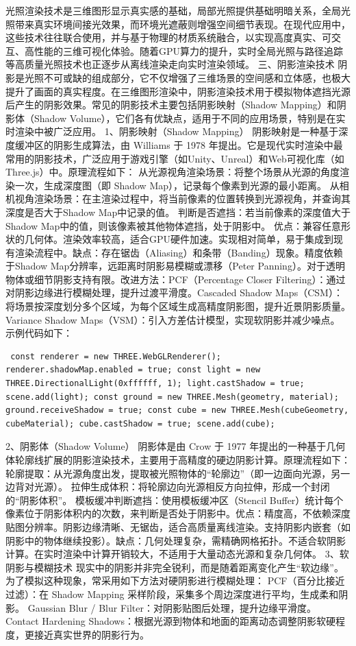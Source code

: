 光照渲染技术是三维图形显示真实感的基础，局部光照提供基础明暗关系，全局光照带来真实环境间接光效果，而环境光遮蔽则增强空间细节表现。在现代应用中，这些技术往往联合使用，并与基于物理的材质系统融合，以实现高度真实、可交互、高性能的三维可视化体验。随着GPU算力的提升，实时全局光照与路径追踪等高质量光照技术也正逐步从离线渲染走向实时渲染领域。 三、阴影渲染技术 阴影是光照不可或缺的组成部分，它不仅增强了三维场景的空间感和立体感，也极大提升了画面的真实程度。在三维图形渲染中，阴影渲染技术用于模拟物体遮挡光源后产生的阴影效果。常见的阴影技术主要包括阴影映射（Shadow Mapping）和阴影体（Shadow Volume），它们各有优缺点，适用于不同的应用场景，特别是在实时渲染中被广泛应用。 1、阴影映射（Shadow Mapping） 阴影映射是一种基于深度缓冲区的阴影生成算法，由 Williams 于 1978 年提出。它是现代实时渲染中最常用的阴影技术，广泛应用于游戏引擎（如Unity、Unreal）和Web可视化库（如Three.js）中。原理流程如下： 从光源视角渲染场景：将整个场景从光源的角度渲染一次，生成深度图（即 Shadow Map），记录每个像素到光源的最小距离。 从相机视角渲染场景：在主渲染过程中，将当前像素的位置转换到光源视角，并查询其深度是否大于Shadow Map中记录的值。 判断是否遮挡：若当前像素的深度值大于Shadow Map中的值，则该像素被其他物体遮挡，处于阴影中。 优点：兼容任意形状的几何体。渲染效率较高，适合GPU硬件加速。实现相对简单，易于集成到现有渲染流程中。缺点：存在锯齿（Aliasing）和条带（Banding）现象。精度依赖于Shadow Map分辨率，远距离时阴影易模糊或漂移（Peter Panning）。对于透明物体或细节阴影支持有限。改进方法：PCF（Percentage Closer Filtering）：通过对阴影边缘进行模糊处理，提升过渡平滑度。Cascaded Shadow Maps（CSM）：将场景按深度划分多个区域，为每个区域生成高精度阴影图，提升近景阴影质量。Variance Shadow Maps（VSM）：引入方差估计模型，实现软阴影并减少噪点。 示例代码如下： \begin{verbatim} const renderer = new THREE.WebGLRenderer(); renderer.shadowMap.enabled = true; const light = new THREE.DirectionalLight(0xffffff, 1); light.castShadow = true; scene.add(light); const ground = new THREE.Mesh(geometry, material); ground.receiveShadow = true; const cube = new THREE.Mesh(cubeGeometry, cubeMaterial); cube.castShadow = true; scene.add(cube); \end{verbatim} 2、阴影体（Shadow Volume） 阴影体是由 Crow 于 1977 年提出的一种基于几何体轮廓线扩展的阴影渲染技术，主要用于高精度的硬边阴影计算。原理流程如下： 轮廓提取：从光源角度出发，提取被光照物体的``轮廓边''（即一边面向光源，另一边背对光源）。 拉伸生成体积：将轮廓边向光源相反方向拉伸，形成一个封闭的``阴影体积''。 模板缓冲判断遮挡：使用模板缓冲区（Stencil Buffer）统计每个像素位于阴影体积内的次数，来判断是否处于阴影中。优点：精度高，不依赖深度贴图分辨率。阴影边缘清晰、无锯齿，适合高质量离线渲染。支持阴影内嵌套（如阴影中的物体继续投影）。缺点：几何处理复杂，需精确网格拓扑。不适合软阴影计算。在实时渲染中计算开销较大，不适用于大量动态光源和复杂几何体。 3、软阴影与模糊技术 现实中的阴影并非完全锐利，而是随着距离变化产生``软边缘''。为了模拟这种现象，常采用如下方法对硬阴影进行模糊处理： PCF（百分比接近过滤）：在 Shadow Mapping 采样阶段，采集多个周边深度进行平均，生成柔和阴影。 Gaussian Blur / Blur Filter：对阴影贴图后处理，提升边缘平滑度。 Contact Hardening Shadows：根据光源到物体和地面的距离动态调整阴影软硬程度，更接近真实世界的阴影行为。 